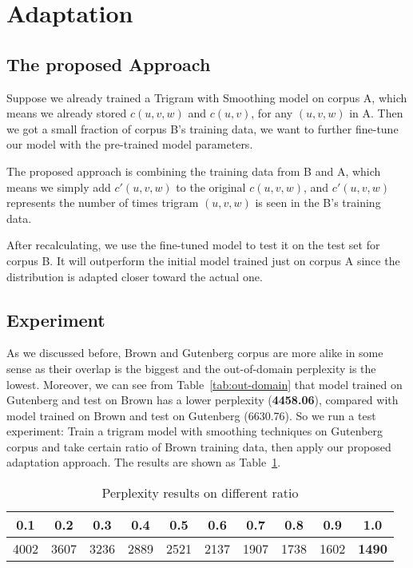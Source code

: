 \section{\textbf{Adaptation}}

\subsection{\textbf{The proposed Approach}}

Suppose we already trained a Trigram with Smoothing model on corpus A, which means we already stored $c(u,v,w)$ and $c(u,v)$, for any $(u,v,w)$ in A. Then we got a small fraction of corpus B's training data, we want to further fine-tune our model with the pre-trained model parameters.

The proposed approach is combining the training data from B and A, which means we simply add $c'(u,v,w)$ to the original $c(u,v,w)$, and $c'(u,v,w)$ represents the number of times trigram $(u,v,w)$ is seen in the B's training data.

After recalculating, we use the fine-tuned model to test it on the test set for corpus B. It will outperform the initial model trained just on corpus A since the distribution is adapted closer toward the actual one.

\subsection{\textbf{Experiment}}

As we discussed before, Brown and Gutenberg corpus are more alike in some sense as their overlap is the biggest and the out-of-domain perplexity is the lowest. Moreover, we can see from Table~\ref{tab:out-domain} that model trained on Gutenberg and test on Brown has a lower perplexity (\textbf{4458.06}), compared with model trained on Brown and test on Gutenberg (6630.76). So we run a test experiment: Train a trigram model with smoothing techniques on Gutenberg corpus and take certain ratio of Brown training data, then apply our proposed adaptation approach. The results are shown as Table~\ref{tab:adaptation}.

\begin{table}[ht]  %
\centering  %
\caption{Perplexity results on different ratio}
\addtolength{\tabcolsep}{-3.5pt}  
\begin{tabular}{cccccccccc}
\hline
    \textbf{0.1} &   \textbf{0.2} &   \textbf{0.3} &   \textbf{0.4} &   \textbf{0.5} &   \textbf{0.6} &   \textbf{0.7} &   \textbf{0.8} &   \textbf{0.9} &   \textbf{1.0} \\
\hline
 4002 & 3607 & 3236 & 2889 & 2521 & 2137 & 1907 & 1738 & 1602 & \textbf{1490} \\
\hline
\end{tabular}
\label{tab:adaptation}
\end{table}

